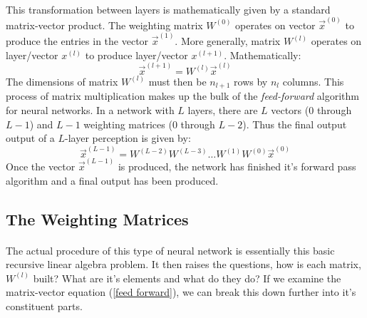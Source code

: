 \documentclass[12pt,letterpaper]{article}
\begin{document}
\paragraph*{}This transformation between layers is mathematically given by a standard matrix-vector product. The weighting matrix $W^{(0)}$ operates on vector $\vec{x}^{(0)}$ to produce the entries in the vector $\vec{x}^{(1)}$. More generally, matrix $W^{(l)}$ operates on layer/vector $x^{(l)}$ to produce layer/vector $x^{(l+1)}$. Mathematically:
\begin{equation}
\label{feed forward}
\vec{x}^{(l+1)} = W^{(l)} \vec{x}^{(l)}
\end{equation}
The dimensions of matrix $W^{(l)}$ must then be $n_{l+1}$ rows by $n_l$ columns. This process of matrix multiplication makes up the bulk of the \textit{feed-forward} algorithm for neural networks. In a network with $L$ layers, there are $L$ vectors ($0$ through $L-1$) and $L-1$ weighting matrices ($0$ through $L-2$). Thus the final output output of a $L$-layer perception is given by:
\begin{equation}
\label{feed forward 2}
\vec{x}^{(L-1)} = W^{(L-2)} W^{(L-3)} \hdots W^{(1)} W^{(0)} \vec{x}^{(0)}
\end{equation}
Once the vector $\vec{x}^{(L-1)}$ is produced, the network has finished it's forward pass algorithm and a final output has been produced. 


\subsection{The Weighting Matrices}
\paragraph*{}The actual procedure of this type of neural network is essentially this basic recursive linear algebra problem. It then raises the questions, how is each matrix, $W^{(l)}$ built? What are it's elements and what do they do? If we examine the matrix-vector equation (\ref{feed forward}), we can break this down further into it's constituent parts.
\end{document}
